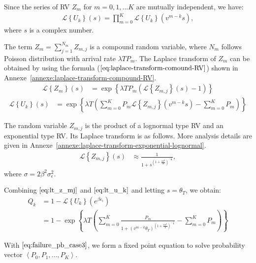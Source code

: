 Since the series of RV $Z_m$ for $m=0,1,...K$ are mutually independent, we have:
\begin{align*}
	\mathcal{L} \left\lbrace U_k \right\rbrace \left( s \right)= \prod_{m=0}^{K} \mathcal{L} \left\lbrace U_k \right\rbrace \left( v^{m-k} s \right),
\end{align*}
where $s$ is a complex number.

The term $Z_m = \sum_{j=1}^{N_m} Z_{m,j}$ is a compound random variable, where $N_m$ follows Poisson distribution with arrival rate $\lambda T P_m$. The Laplace transform of $Z_m$ can be obtained by using the formula ($\ref{eq:laplace-transform-comound-RV}$) shown in Annexe~\ref{annexe:laplace-transform-compound-RV}.
\begin{align*}
	\mathcal{L} \left\lbrace Z_m \right\rbrace \left( s \right)&= \exp\left\lbrace \lambda T P_m \left( \mathcal{L} \left\lbrace Z_{m,j} \right\rbrace \left( s \right)  - 1\right) \right\rbrace 
\end{align*}
\begin{align}
	\label{eq:lt_u_k}
	\mathcal{L} \left\lbrace U_k \right\rbrace \left( s \right) &= \exp\left\lbrace 
	\lambda T\left( \sum_{m=0}^{K}P_m \mathcal{L} \left\lbrace Z_{m,j} \right\rbrace \left( v^{m-k} s \right) - \sum_{m=0}^{K}P_m\right) 
	\right\rbrace
\end{align}

The random variable $Z_{m,j}$ is the product of a lognormal type RV and an exponential type RV. Its Laplace transform is as follows. More analysis details are given in Annexe~\ref{annexe:laplace-transform-exponential-lognormal}.
\begin{align}
	\label{eq:lt_z_mj}
	\mathcal{L} \left\lbrace Z_{m,j} \right\rbrace \left( s \right)
	&\approx  \frac{1}{1 + s ^{\left( 1 +\frac{\pi \sigma^2}{8} \right)^{-\frac{1}{2}}}},
\end{align}
where $\sigma = 2\beta^2\sigma_{\epsilon}^2$.

Combining $\eqref{eq:lt_z_mj}$ and $\eqref{eq:lt_u_k}$ and letting $s = \theta_{T}$, we obtain:
\begin{align}
	\label{eq:failure_pb_case3}
	Q_{k}  &=  1- \mathcal{L} \left\lbrace U_k \right\rbrace \left( e^{\beta\epsilon_i} \right) \nonumber\\
	&= 1- \exp\left\lbrace \lambda T\left( \sum_{m=0}^{K} \frac{P_m}{1 + \left( v^{m-k} \theta_{T} \right) ^{\left( 1 +\frac{\pi \sigma^2}{8} \right)^{-\frac{1}{2}}}} -\sum_{m=0}^{K}P_m \right) \right\rbrace 
\end{align}

With $\eqref{eq:failure_pb_case3}$, we form a fixed point equation to solve probability vector $\left\langle P_0, P_1, ..., P_K\right\rangle$.
